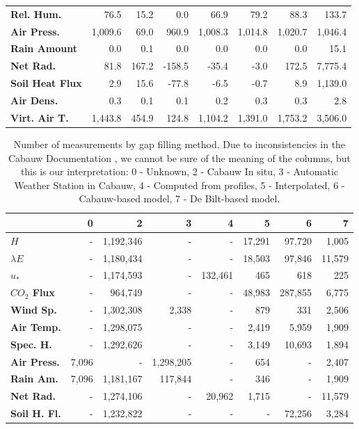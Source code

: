 \documentclass[a4paper,11pt]{kth-mag}
\begin{document}
\begin{table}
\begin{tabular*}{\textwidth}{l| @{\extracolsep{\fill}} rrrrrrr}
\textbf{Rel. Hum.} & 76.5 & 15.2 & 0.0 & 66.9 & 79.2 & 88.3 & 133.7 \\
\textbf{Air Press.} & 1,009.6 & 69.0 & 960.9 & 1,008.3 & 1,014.8 & 1,020.7 &  1,046.4  \\
\textbf{Rain Amount} & 0.0 & 0.1 & 0.0 & 0.0 & 0.0 & 0.0 & 15.1 \\
\textbf{Net Rad.} & 81.8 & 167.2 & -158.5 & -35.4 & -3.0 & 172.5 & 7,775.4 \\
\textbf{Soil Heat Flux} & 2.9 & 15.6 & -77.8 & -6.5 & -0.7 & 8.9 & 1,139.0 \\
\hline
\textbf{Air Dens.} & 0.3 & 0.1 & 0.1 & 0.2 & 0.3 & 0.3 & 2.8 \\
\textbf{Virt. Air T.} & 1,443.8 & 454.9 & 124.8 & 1,104.2 & 1,391.0 & 1,753.2 & 3,506.0 \\
\bottomrule
\end{tabular*}
\end{table}



\begin{table}
\centering
\caption{Number of measurements by gap filling method. Due to inconsistencies in the Cabauw Documentation \citep{cabauw_gapfilling}, we cannot be sure of the meaning of the columns, but this is our interpretation: 0 - Unknown, 2 - Cabauw In situ, 3 - Automatic Weather Station in Cabauw, 4 - Computed from profiles, 5 - Interpolated, 6 - Cabauw-based model, 7 - De Bilt-based model.}
\label{tbl:col_gapfilled}
\begin{tabular*}{\textwidth}{l| @{\extracolsep{\fill}} rrrrrrr}
\toprule
& \textbf{0} & \textbf{2} & \textbf{3} & \textbf{4} & \textbf{5}  & \textbf{6}  & \textbf{7} \\ \midrule
\textbf{$H$} & - &  1,192,346 & - & - &  17,291 &  97,720 &  1,005 \\
\textbf{$\lambda E$} & - &  1,180,434 & - & - &  18,503 &  97,846 &  11,579 \\
\textbf{$u_*$} & - &  1,174,593 & - &  132,461 &  465 &  618 &  225 \\
\textbf{$CO_2$ Flux} & - &  964,749 & - & - &  48,983 &  287,855 &  6,775 \\
\textbf{Wind Sp.} & - &  1,302,308 &  2,338 & - &  879 &  331 &  2,506 \\
\textbf{Air Temp.} & - &  1,298,075 & - & - &  2,419 &  5,959 &  1,909 \\
\textbf{Spec. H.} & - &  1,292,626 & - & - &  3,149 &  10,693 &  1,894 \\
\textbf{Air Press.} &  7,096 & - &  1,298,205 & - &  654 & - &  2,407 \\
\textbf{Rain Am.} &  7,096 &  1,181,167 &  117,844 & - &  346 & - &  1,909 
\\
\textbf{Net Rad.} & - &  1,274,106 & -&  20,962 &  1,715 & - &  11,579 \\
\textbf{Soil H. Fl.} & - &  1,232,822 & - & - & - &  72,256 &  3,284 \\
\bottomrule
\end{tabular*}
\end{table}
\end{document}
